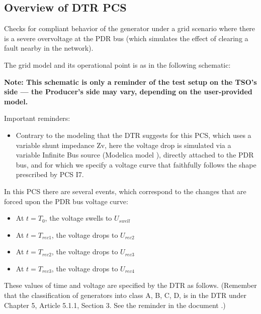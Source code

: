     \subsection{Overview of DTR PCS \DTRPcs}

    Checks for compliant behavior of the generator under a grid scenario where
    there is a severe overvoltage at the PDR bus (which simulates the
    effect of clearing a fault nearby in the network).

    The grid model and its operational point is as in the following schematic:
    \begin{center}
        
    \end{center}
    \begin{center}
        \small \textbf{Note: This schematic is only a reminder of the test setup on the TSO's
        side --- the Producer's side may vary, depending on the user-provided model.}
    \end{center}

    \noindent Important reminders:
    \begin{itemize}
        \item Contrary to the modeling that the DTR suggests for this PCS, which uses a
        variable shunt impedance Zv, here the voltage drop is simulated via a variable
        Infinite Bus source (Modelica model ), directly
        attached to the PDR bus, and for which we specify a voltage curve that
        faithfully follows the shape prescribed by PCS I7.
    \end{itemize}

    In this PCS there are several events, which correspond to the changes that are
    forced upon the PDR bus voltage curve:
    \begin{itemize}
        \item At $t = T_{0}$, the voltage swells to $U_{swell}$
        \item At $t = T_{rec1}$, the voltage drops to $U_{rec2}$
        \item At $t = T_{rec2}$, the voltage drops to $U_{rec3}$
        \item At $t = T_{rec3}$, the voltage drops to $U_{rec4}$
    \end{itemize}
    These values of time and voltage are specified by the DTR as follows. (Remember
    that the classification of generators into class A, B, C, D, is in the DTR under
    Chapter 5, Article 5.1.1, Section 3. See the reminder in the document
    .)

